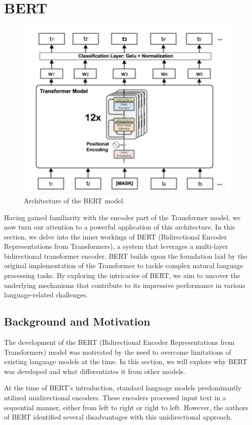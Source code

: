 \documentclass[a4paper,10pt]{report} %
\begin{document}
\section{BERT}
\begin{figure} %
  \centering
  \includegraphics[width=12cm]{img/bert_architecture.png}
  \caption{Architecture of the BERT model.}
  \label{fig:bert_architecture}
\end{figure}
Having gained familiarity with the encoder part of the Transformer model, we now turn our attention to a powerful application of this architecture. In this section, we delve into the inner workings of BERT (Bidirectional Encoder Representations from Transformers), a system that leverages a multi-layer bidirectional transformer encoder. BERT builds upon the foundation laid by the original implementation of the Transformer to tackle complex natural language processing tasks. By exploring the intricacies of BERT, we aim to uncover the underlying mechanisms that contribute to its impressive performance in various language-related challenges.

\subsection{Background and Motivation}
The development of the BERT (Bidirectional Encoder Representations from Transformers) model was motivated by the need to overcome limitations of existing language models at the time. In this section, we will explore why BERT was developed and what differentiates it from other models.

At the time of BERT's introduction, standard language models predominantly utilized unidirectional encoders. These encoders processed input text in a sequential manner, either from left to right or right to left. However, the authors of BERT identified several disadvantages with this unidirectional approach.
\end{document}
